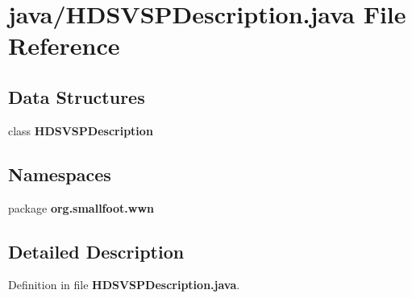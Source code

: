 \section{java/\-H\-D\-S\-V\-S\-P\-Description.java \-File \-Reference}
\label{HDSVSPDescription_8java}
\subsection*{\-Data \-Structures}
\begin{DoxyCompactItemize}
\item 
class {\bf \-H\-D\-S\-V\-S\-P\-Description}
\end{DoxyCompactItemize}
\subsection*{\-Namespaces}
\begin{DoxyCompactItemize}
\item 
package {\bf org.\-smallfoot.\-wwn}
\end{DoxyCompactItemize}


\subsection{\-Detailed \-Description}


\-Definition in file {\bf \-H\-D\-S\-V\-S\-P\-Description.\-java}.

